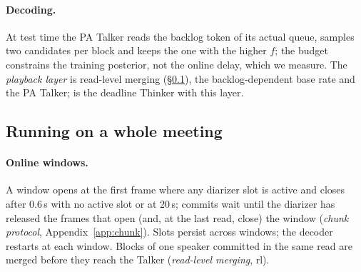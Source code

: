 \paragraph{Decoding.} At test time the PA Talker reads the backlog token of its actual queue, samples two candidates
per block and keeps the one with the higher $f$; the budget constrains the training posterior, not the online delay,
which we measure. The \emph{playback layer} is read-level merging (\S\ref{sec:method-online}), the backlog-dependent
base rate and the PA Talker; \sys{} is the deadline Thinker with this layer.

\subsection{Running on a whole meeting}
\label{sec:method-online}

\paragraph{Online windows.} A window opens at the first frame where any diarizer slot is active and closes after
0.6\,s with no active slot or at 20\,s; commits wait until the diarizer has released the frames that open (and, at the
last read, close) the window (\emph{chunk protocol}, Appendix~\ref{app:chunk}). Slots persist across windows; the
decoder restarts at each window. Blocks of one speaker committed in the same read are merged before they reach the
Talker (\emph{read-level merging}, rl).
